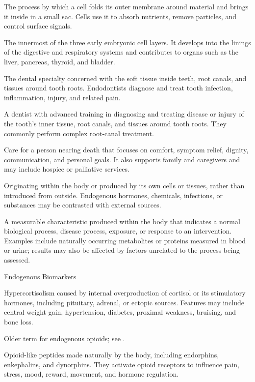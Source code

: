  The process by which a cell folds its outer membrane around material and brings it inside in a small sac. Cells use it to absorb nutrients, remove particles, and control surface signals.

 The innermost of the three early embryonic cell layers. It develops into the linings of the digestive and respiratory systems and contributes to organs such as the liver, pancreas, thyroid, and bladder.

 The dental specialty concerned with the soft tissue inside teeth, root canals, and tissues around tooth roots. Endodontists diagnose and treat tooth infection, inflammation, injury, and related pain.

 A dentist with advanced training in diagnosing and treating disease or injury of the tooth’s inner tissue, root canals, and tissues around tooth roots. They commonly perform complex root-canal treatment.

 Care for a person nearing death that focuses on comfort, symptom relief, dignity, communication, and personal goals. It also supports family and caregivers and may include hospice or palliative services.

 Originating within the body or produced by its own cells or tissues, rather than introduced from outside. Endogenous hormones, chemicals, infections, or substances may be contrasted with external sources.

 A measurable characteristic produced within the body that indicates a normal biological process, disease process, exposure, or response to an intervention. Examples include naturally occurring metabolites or proteins measured in blood or urine; results may also be affected by factors unrelated to the process being assessed.

\synonyms
Endogenous Biomarkers

 Hypercortisolism caused by internal overproduction of cortisol or its stimulatory hormones, including pituitary, adrenal, or ectopic sources. Features may include central weight gain, hypertension, diabetes, proximal weakness, bruising, and bone loss.

 Older term for endogenous opioids; see .

 Opioid-like peptides made naturally by the body, including endorphins, enkephalins, and dynorphins. They activate opioid receptors to influence pain, stress, mood, reward, movement, and hormone regulation.

